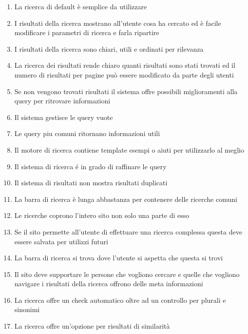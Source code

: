 \documentclass[../Report.tex]{subfiles}
\begin{document}
    \begin{enumerate}
        \item La ricerca di default è semplice da utilizzare 
        \item I risultati della ricerca mostrano all’utente cosa ha cercato ed è facile modificare i parametri di ricerca e farla ripartire 
        \item I risultati della ricerca sono chiari, utili e ordinati per rilevanza
        \item La ricerca dei risultati rende chiaro quanti risultati sono stati trovati ed il numero di risultati per pagine può essere modificato da parte degli utenti 
        \item Se non vengono trovati risultati il sistema offre possibili miglioramenti alla query per ritrovare informazioni 
        \item Il sistema gestisce le query vuote
        \item Le query piu comuni ritornano informazioni utili 
        \item Il motore di ricerca contiene template esempi o aiuti per utilizzarlo al meglio 
        \item Il sistema di ricerca é in grado di raffinare le query
        \item Il sistema di risultati non mostra risultati duplicati 
        \item La barra di ricerca è lunga abbastanza per contenere delle ricerche comuni
        \item Le ricerche coprono l’intero sito non solo una parte di esso 
        \item Se il sito permette all’utente di effettuare una ricerca complessa questa deve essere salvata per utilizzi futuri 
        \item La barra di ricerca si trova dove l’utente si aspetta che questa si trovi 
        \item Il sito deve supportare le persone che vogliono cercare e quelle che vogliono navigare 
        i risultati della ricerca offrono delle meta informazioni
        \item La ricerca offre un check automatico oltre ad un controllo per plurali e sinonimi 
        \item La ricerca offre un’opzione per risultati di similarità
        
    \end{enumerate}
\end{document}
